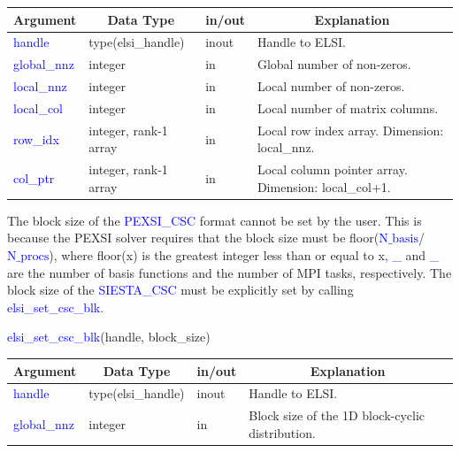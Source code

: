\documentclass{report}
\newcommand{\tcb}[1]{\textcolor{blue}{#1}}
\begin{document}
\begin{tabular}[]{|p{30mm}|p{35mm}|p{15mm}|p{85mm}|}
\hline
\multicolumn{1}{|c|}{\textbf{Argument}} & \multicolumn{1}{c|}{\textbf{Data Type}} & \multicolumn{1}{c|}{\textbf{in/out}} & \multicolumn{1}{c|}{\textbf{Explanation}}\\
\hline
\tcb{handle}      & type(elsi\_handle)    & inout & Handle to ELSI.\\
\hline
\tcb{global\_nnz} & integer               & in    & Global number of non-zeros.\\
\hline
\tcb{local\_nnz}  & integer               & in    & Local number of non-zeros.\\
\hline
\tcb{local\_col}  & integer               & in    & Local number of matrix columns.\\
\hline
\tcb{row\_idx}    & integer, rank-1 array & in    & Local row index array. Dimension: local\_nnz.\\
\hline
\tcb{col\_ptr}    & integer, rank-1 array & in    & Local column pointer array. Dimension: local\_col+1.\\
\hline
\end{tabular}

The block size of the \tcb{PEXSI\_CSC} format cannot be set by the user. This is because the PEXSI solver requires that the block size must be floor(\tcb{$\text{N}\_\text{basis}$}/\tcb{$\text{N}\_\text{procs}$}), where floor(x) is the greatest integer less than or equal to x, \tcb{\_} and \tcb{\_} are the number of basis functions and the number of MPI tasks, respectively. The block size of the \tcb{SIESTA\_CSC} must be explicitly set by calling \tcb{elsi\_set\_csc\_blk}.

\newpage
\begin{labeling}{\hspace{6cm}}
\item [\hspace{0.3cm} \tcb{elsi\_set\_csc\_blk}(handle, block\_size)]
\end{labeling}

\begin{tabular}[]{|p{30mm}|p{30mm}|p{15mm}|p{90mm}|}
\hline
\multicolumn{1}{|c|}{\textbf{Argument}} & \multicolumn{1}{c|}{\textbf{Data Type}} & \multicolumn{1}{c|}{\textbf{in/out}} & \multicolumn{1}{c|}{\textbf{Explanation}}\\
\hline
\tcb{handle}      & type(elsi\_handle) & inout & Handle to ELSI.\\
\hline
\tcb{global\_nnz} & integer            & in    & Block size of the 1D block-cyclic distribution.\\
\hline
\end{tabular}
\end{document}
